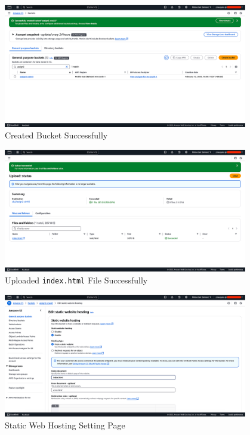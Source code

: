 \documentclass[a4paper,12pt]{article}
\begin{document}
\begin{figure}[H]
    \centering
    \includegraphics[width=0.95\textwidth]{host-static-website-4.png}
    \caption{Created Bucket Successfully}
    \label{fig:static4}
\end{figure}

\begin{figure}[H]
    \centering
    \includegraphics[width=0.95\textwidth]{host-static-website-5.png}
    \caption{Uploaded \texttt{index.html} File Successfully}
    \label{fig:static5}
\end{figure}

\begin{figure}[H]
    \centering
    \includegraphics[width=0.95\textwidth]{host-static-website-6.png}
    \caption{Static Web Hosting Setting Page}
    \label{fig:static6}
\end{figure}
\end{document}
